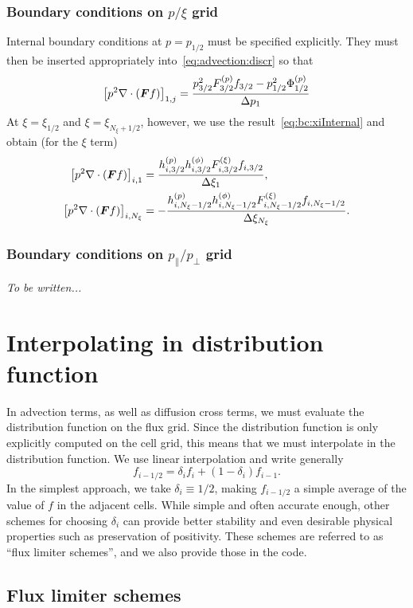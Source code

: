 \documentclass{notes}
\begin{document}
    \subsubsection{Boundary conditions on $p/\xi$ grid}
    Internal boundary conditions at $p=p_{1/2}$ must be specified explicitly.
    They must then be inserted appropriately into~\eqref{eq:advection:discr} so
    that
    \begin{equation}
        \left[ p^2\nabla\cdot\left( \boldsymbol{F}f \right) \right]_{1,j} = \frac{
            p_{3/2}^2 F_{3/2}^{(p)} f_{3/2} - p_{1/2}^2\Phi^{(p)}_{1/2}
        }{\Delta p_{1}}
    \end{equation}
    At $\xi=\xi_{1/2}$ and $\xi=\xi_{N_\xi+1/2}$, however, we use the
    result~\eqref{eq:bc:xiInternal} and obtain (for the $\xi$ term)
    \begin{equation}
        \begin{aligned}
            \left[ p^2\nabla\cdot\left( \boldsymbol{F} f \right) \right]_{i,1} &=
                \frac{h^{(p)}_{i,3/2}h^{(\phi)}_{i,3/2} F^{(\xi)}_{i,3/2} f_{i,3/2}}{\Delta\xi_{1}},\\
            \left[ p^2\nabla\cdot\left( \boldsymbol{F} f \right) \right]_{i,N_\xi} &=
                -\frac{h^{(p)}_{i,N_\xi-1/2}h^{(\phi)}_{i,N_\xi-1/2} F^{(\xi)}_{i,N_\xi-1/2} f_{i,N_\xi-1/2}}{\Delta\xi_{N_\xi}}.
        \end{aligned}
    \end{equation}

    \subsubsection{Boundary conditions on $p_\parallel / p_\perp$ grid}
    \emph{To be written...}

    \section{Interpolating in distribution function}\label{sec:interp}
    In advection terms, as well as diffusion cross terms, we must evaluate the
    distribution function on the flux grid. Since the distribution function is
    only explicitly computed on the cell grid, this means that we must
    interpolate in the distribution function. We use linear interpolation and
    write generally
    \begin{equation}
        f_{i-1/2} = \delta_{i} f_i + \left( 1 - \delta_i \right) f_{i-1}.
    \end{equation}
    In the simplest approach, we take $\delta_i\equiv 1/2$, making $f_{i-1/2}$
    a simple average of the value of $f$ in the adjacent cells. While simple and
    often accurate enough, other schemes for choosing $\delta_i$ can provide
    better stability and even desirable physical properties such as preservation
    of positivity. These schemes are referred to as ``flux limiter schemes'',
    and we also provide those in the code.

    \subsection{Flux limiter schemes}
\end{document}
